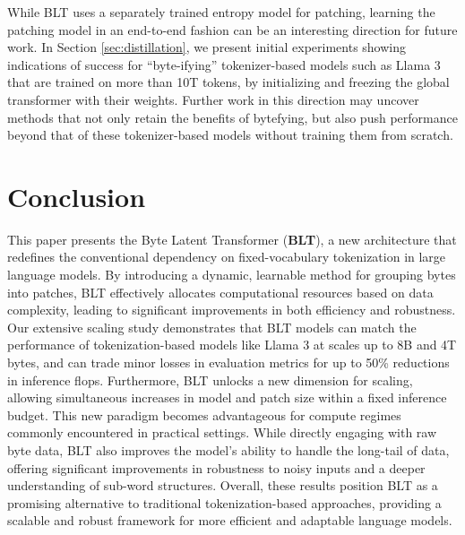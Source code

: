 While {\textsc BLT} uses a separately trained entropy model for patching, learning the patching model in an end-to-end fashion can be an interesting direction for future work. In Section \ref{sec:distillation}, we present initial experiments showing indications of success for ``byte-ifying'' tokenizer-based models such as Llama 3 that are trained on more than 10T tokens, by initializing and freezing the global transformer with their weights. Further work in this direction may uncover methods that not only retain the benefits of bytefying, but also push performance beyond that of these tokenizer-based models without training them from scratch. 

\section{Conclusion}
\label{section:conclusion}

This paper presents the Byte Latent Transformer (\textbf{BLT}), a new architecture that redefines the conventional dependency on fixed-vocabulary tokenization in large language models. By introducing a dynamic, learnable method for grouping bytes into patches, {\textsc BLT} effectively allocates computational resources based on data complexity, leading to significant improvements in both efficiency and robustness. Our extensive scaling study demonstrates that {\textsc BLT} models can match the performance of tokenization-based models  like Llama 3 at scales up to 8B and 4T bytes, and can trade minor losses in evaluation metrics for up to 50\% reductions in inference flops. Furthermore, {\textsc BLT} unlocks a new dimension for scaling, allowing simultaneous increases in model and patch size within a fixed inference budget. This new paradigm becomes advantageous for compute regimes commonly encountered in practical settings. While directly engaging with raw byte data, {\textsc BLT} also improves the model's ability to handle the long-tail of data, offering significant improvements in robustness to noisy inputs and a deeper understanding of sub-word structures. Overall, these results position {\textsc BLT} as a promising alternative to traditional tokenization-based approaches, providing a scalable and robust framework for more efficient and adaptable language models.

